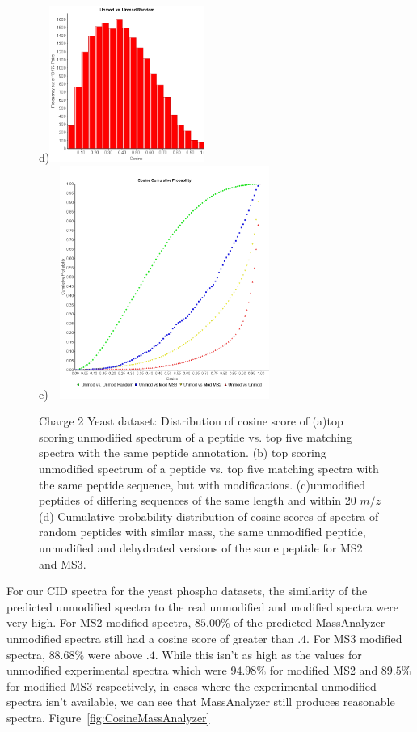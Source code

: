 \begin{figure}[htbp]
d)\includegraphics[width=2in,height=2in]{fig/phospho/cosine_unmod_vs_unmod_random.png} \\
e)\includegraphics[width=3in,height=3in]{fig/phospho/cumulative_probability.png}
\caption{Charge 2 Yeast dataset: Distribution of cosine score of (a)top scoring unmodified spectrum of a peptide vs. top five matching spectra with the same peptide annotation. (b) top scoring unmodified spectrum of a peptide vs. top five matching spectra with the same peptide sequence, but with modifications. (c)unmodified peptides of differing sequences of the same length and within 20 $m/z$  (d) Cumulative probability distribution of cosine scores of spectra of random peptides with similar mass, the same unmodified peptide, unmodified and dehydrated versions of the same peptide for MS2 and MS3.}
\label{fig:Yeast_CosineScoreDist}
\end{figure}

For our CID spectra for the yeast phospho datasets, the similarity of 
the predicted unmodified spectra to the real unmodified and modified spectra were very high. For MS2 modified spectra, $85.00\%$ 
of the predicted MassAnalyzer unmodified spectra still had a cosine score of greater than $.4$. For MS3 modified spectra, $88.68\%$ were above $.4$. 
While this isn't as high as the values for unmodified experimental spectra which were $94.98\%$ for modified MS2 and $89.5\%$ for modified MS3 respectively,
in cases where the experimental unmodified spectra isn't available, we can see that 
MassAnalyzer still produces reasonable spectra. Figure~\ref{fig:CosineMassAnalyzer}


